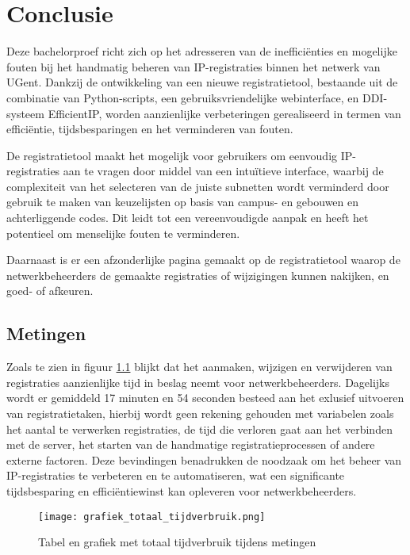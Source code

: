 
\chapter{Conclusie}%
\label{ch:conclusie}

Deze bachelorproef richt zich op het adresseren van de inefficiënties en mogelijke fouten bij het handmatig beheren van IP-registraties binnen het netwerk van UGent. Dankzij de ontwikkeling van een nieuwe registratietool, bestaande uit de combinatie van Python-scripts, een gebruiksvriendelijke webinterface, en DDI-systeem EfficientIP, worden aanzienlijke verbeteringen gerealiseerd in termen van efficiëntie, tijdsbesparingen en het verminderen van fouten.

De registratietool maakt het mogelijk voor gebruikers om eenvoudig IP-registraties aan te vragen door middel van een intuïtieve interface, waarbij de complexiteit van het selecteren van de juiste subnetten wordt verminderd door gebruik te maken van keuzelijsten op basis van campus- en gebouwen en achterliggende codes. Dit leidt tot een vereenvoudigde aanpak en heeft het potentieel om menselijke fouten te verminderen. 

Daarnaast is er een afzonderlijke pagina gemaakt op de registratietool waarop de netwerkbeheerders de gemaakte registraties of wijzigingen kunnen nakijken, en goed- of afkeuren.

\section{Metingen}
Zoals te zien in figuur \ref{fig:tijdverbruik_metingen} blijkt dat het aanmaken, wijzigen en verwijderen van registraties aanzienlijke tijd in beslag neemt voor netwerkbeheerders. Dagelijks wordt er gemiddeld 17 minuten en 54 seconden besteed aan het exlusief uitvoeren van registratietaken, hierbij wordt geen rekening gehouden met variabelen zoals het aantal te verwerken registraties, de tijd die verloren gaat aan het verbinden met de server, het starten van de handmatige registratieprocessen of andere externe factoren. Deze bevindingen benadrukken de noodzaak om het beheer van IP-registraties te verbeteren en te automatiseren, wat een significante tijdsbesparing en efficiëntiewinst kan opleveren voor netwerkbeheerders.

\begin{figure}[H]
    \texttt{[image: grafiek\_totaal\_tijdverbruik.png]}
    \caption{Tabel en grafiek met totaal tijdverbruik tijdens metingen}
    \label{fig:tijdverbruik_metingen}
\end{figure}

